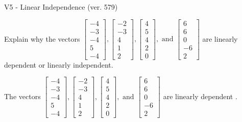 \begin{exercise}
  \begin{exerciseTitle}V5 - Linear Independence (ver. 579)\end{exerciseTitle}
  \begin{exerciseStatement}
    Explain why the vectors \(\left[\begin{array}{r}
-4 \\
-3 \\
-4 \\
5 \\
-4
\end{array}\right] , \left[\begin{array}{r}
-2 \\
-3 \\
4 \\
1 \\
2
\end{array}\right] , \left[\begin{array}{r}
4 \\
5 \\
4 \\
2 \\
0
\end{array}\right] , \text{ and } \left[\begin{array}{r}
6 \\
6 \\
0 \\
-6 \\
2
\end{array}\right]\) are linearly dependent or linearly independent.	


  \end{exerciseStatement}
  \begin{exerciseAnswer}
   The vectors \(\left[\begin{array}{r}
-4 \\
-3 \\
-4 \\
5 \\
-4
\end{array}\right] , \left[\begin{array}{r}
-2 \\
-3 \\
4 \\
1 \\
2
\end{array}\right] , \left[\begin{array}{r}
4 \\
5 \\
4 \\
2 \\
0
\end{array}\right] , \text{ and } \left[\begin{array}{r}
6 \\
6 \\
0 \\
-6 \\
2
\end{array}\right]\) are 
  	 linearly dependent  .
  


  \end{exerciseAnswer}
\end{exercise}
